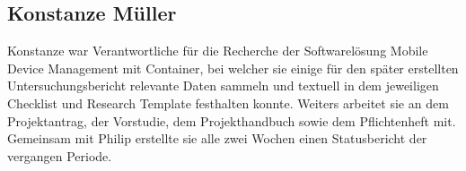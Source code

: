\subsection{Konstanze Müller}
Konstanze war Verantwortliche für die Recherche der Softwarelösung Mobile Device Management mit Container, bei welcher sie einige für den später erstellten Untersuchungsbericht relevante Daten sammeln und textuell in dem jeweiligen Checklist und Research Template festhalten konnte. Weiters arbeitet sie an dem Projektantrag, der Vorstudie, dem Projekthandbuch sowie dem Pflichtenheft mit. Gemeinsam mit Philip erstellte sie alle zwei Wochen einen Statusbericht der vergangen Periode.

